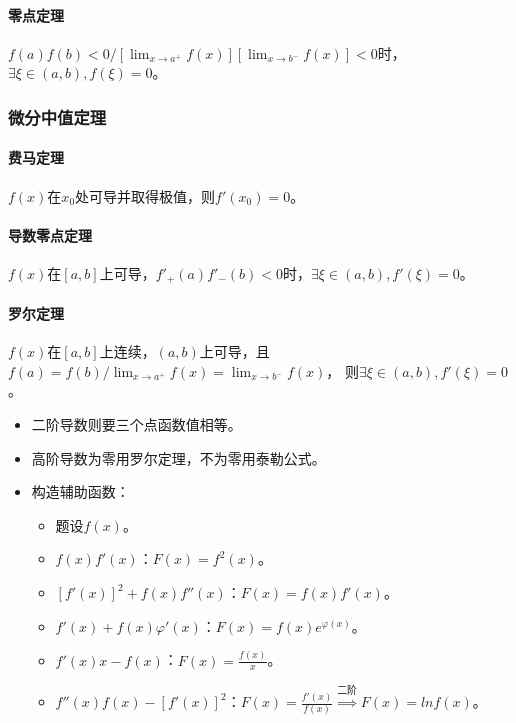 \documentclass[
12pt, %
a4paper, 
oneside, %
headinclude,footinclude, %
]{scrartcl}
\begin{document}
\paragraph{零点定理}
$ f(a)f(b) < 0 / [\lim_{x \to a^+} f(x)][\lim_{x \to b^-} f(x)] < 0 $时，$ \exists \xi \in (a, b), f(\xi) = 0 $。
\subsubsection[微分中值定理]{微分中值定理}
\paragraph{费马定理}
$ f(x) $在$ x_0 $处可导并取得极值，则$ f'(x_0) = 0 $。
\paragraph{导数零点定理}
$ f(x) $在$ [a, b] $上可导，$ f'_+(a)f'_-(b) < 0 $时，$ \exists \xi \in (a, b), f'(\xi) = 0 $。
\paragraph{罗尔定理}
$ f(x) $在$ [a, b] $上连续，$ (a, b) $上可导，且$ f(a) = f(b) / \lim_{x \to a^+} f(x) = \lim_{x \to b^-} f(x) $，
则$ \exists \xi \in (a, b), f'(\xi) = 0 $。
\begin{itemize}
\item 二阶导数则要三个点函数值相等。
\item 高阶导数为零用罗尔定理，不为零用泰勒公式。
\item 构造辅助函数：
\begin{itemize}
\item 题设$ f(x) $。
\item $ f(x)f'(x) $：$ F(x) = f^2(x) $。
\item $ [f'(x)]^2 + f(x)f''(x) $：$ F(x) = f(x)f'(x) $。
\item $ f'(x) + f(x)\varphi'(x) $：$ F(x) = f(x)e^{\varphi(x)} $。
\item $ f'(x)x - f(x) $：$ F(x) = \frac{f(x)}{x} $。
\item $ f''(x)f(x) - [f'(x)]^2 $：$ F(x) = \frac{f'(x)}{f(x)} $$ \overset{\text{二阶}}{\Longrightarrow} $$ F(x) = ln f(x) $。
\end{itemize}
\end{itemize}
\end{document}
